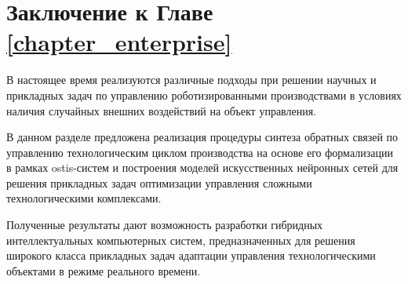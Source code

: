 




\section*{Заключение к Главе \ref{chapter_enterprise}}

В настоящее время реализуются различные подходы при решении научных и прикладных задач по управлению роботизированными производствами в условиях наличия случайных внешних воздействий на объект управления.

В данном разделе предложена реализация процедуры синтеза обратных связей по управлению технологическим циклом производства на основе его формализации в рамках ostis-систем и построения моделей искусственных нейронных сетей для решения прикладных задач оптимизации управления сложными технологическими комплексами.

Полученные результаты дают возможность разработки гибридных интеллектуальных компьютерных систем, предназначенных для решения широкого класса прикладных задач адаптации управления технологическими объектами в режиме реального времени.






%
